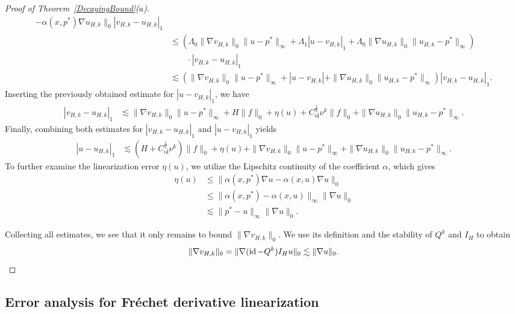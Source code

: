 \documentclass{article}
\begin{document}
\begin{proof}[Proof of Theorem~\ref{DecayingBound}($a$)]
\begin{align*}
    -\alpha(x,p^*)\nabla u_{H,k}\|_0 {|v_{H,k}-u_{H,k}|_1}\\
    &\leq (\Lambda_0 \|\nabla v_{H,k}\|_0\|u-p^*\|_\infty+\Lambda_1|u-v_{H,k}|_1+\Lambda_0\|\nabla u_{H,k}\|_0\|u_{H,k}-p^*\|_\infty)\\
    &\qquad\cdot|v_{H,k}-u_{H,k}|_1 \\
    &\lesssim ( \|\nabla v_{H,k}\|_0\|u-p^*\|_\infty+|u-v_{H,k}|+\|\nabla u_{H,k}\|_0\|u_{H,k}-p^*\|_\infty) |v_{H,k}-u_{H,k}|_1.
\end{align*}
 Inserting the previously obtained estimate for $|u-v_{H,k}|_1$, we have
\begin{align*}
    |v_{H,k}-u_{H,k}|_1 &\lesssim \|\nabla v_{H,k}\|_0\|u-p^*\|_\infty+H\|f\|_0 +\eta(u)+{C_\mathrm{ol}^\frac{1}{2} \nu^k}\|f\|_0+\|\nabla u_{H,k}\|_0\|u_{H,k}-p^*\|_\infty.
\end{align*}
Finally, combining both estimates for $|v_{H,k}-u_{H,k}|_1$ and $|u-v_{H,k}|_1$ yields
\begin{align*}
    |u-u_{H,k}|_1 & \lesssim (H+{C_\mathrm{ol}^\frac{1}{2} \nu^k})\|f\|_0 +\eta(u)+  \|\nabla v_{H,k}\|_0\|u-p^*\|_\infty+\|\nabla u_{H,k}\|_0\|u_{H,k}-p^*\|_\infty. 
\end{align*}
To further examine the linearization error $\eta(u)$, we utilize the Lipschitz continuity of the coefficient $\alpha$, which gives 
\begin{align*}
    \eta(u)&\leq\|\alpha(x,p^*)\nabla u -\alpha(x,u)\nabla u\|_0\\
    &\leq\|\alpha(x,p^*)-\alpha(x,u)\|_\infty\|\nabla u\|_0\\
    & \lesssim \| p^* - u\|_\infty\|\nabla u\|_0.
\end{align*}
 
Collecting all estimates, we see that it only remains to bound $\|\nabla v_{H,k}\|_0$. We use its definition and the stability of $Q^k$ and $I_H$ to obtain
 \[\|\nabla v_{H,k} \|_0=\|\nabla (\operatorname{id}-Q^k)I_Hu\|_0\lesssim  \|\nabla u\|_0. \qedhere\]
 
\end{proof}


\subsection{Error analysis for Fréchet derivative linearization}\label{Section3.2}

 
 
\end{document}
